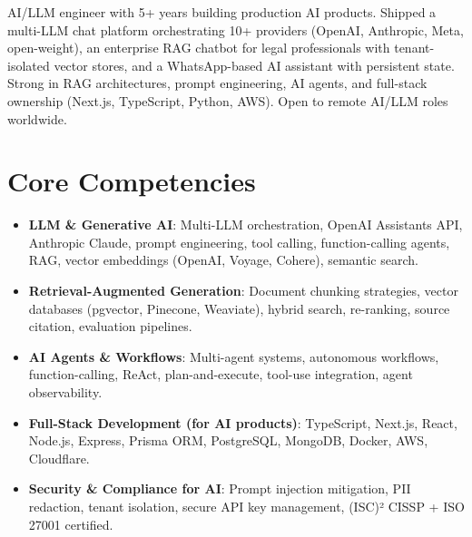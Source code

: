 \documentclass[11pt,a4paper,sans]{moderncv}
\begin{document}
\makecvtitle


\vspace{6pt}
\small{AI/LLM engineer with 5+ years building production AI products. Shipped a multi-LLM chat platform orchestrating 10+ providers (OpenAI, Anthropic, Meta, open-weight), an enterprise RAG chatbot for legal professionals with tenant-isolated vector stores, and a WhatsApp-based AI assistant with persistent state. Strong in RAG architectures, prompt engineering, AI agents, and full-stack ownership (Next.js, TypeScript, Python, AWS). Open to remote AI/LLM roles worldwide.}


\section{Core Competencies}
\vspace{1pt}
\begin{itemize}

\item \textbf{LLM \& Generative AI}: Multi-LLM orchestration, OpenAI Assistants API, Anthropic Claude, prompt engineering, tool calling, function-calling agents, RAG, vector embeddings (OpenAI, Voyage, Cohere), semantic search.

\item \textbf{Retrieval-Augmented Generation}: Document chunking strategies, vector databases (pgvector, Pinecone, Weaviate), hybrid search, re-ranking, source citation, evaluation pipelines.

\item \textbf{AI Agents \& Workflows}: Multi-agent systems, autonomous workflows, function-calling, ReAct, plan-and-execute, tool-use integration, agent observability.

\item \textbf{Full-Stack Development (for AI products)}: TypeScript, Next.js, React, Node.js, Express, Prisma ORM, PostgreSQL, MongoDB, Docker, AWS, Cloudflare.

\item \textbf{Security \& Compliance for AI}: Prompt injection mitigation, PII redaction, tenant isolation, secure API key management, (ISC)² CISSP + ISO 27001 certified.

\end{itemize}
\end{document}
